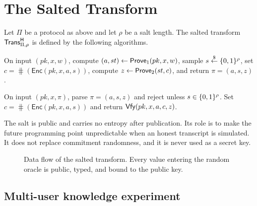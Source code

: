 \section{The Salted Transform}
\label{sec:transform}

Let $\Pi$ be a protocol as above and let $\rho$ be a salt length.  The salted
transform $\mathsf{Trans}^{\mathsf{H}}_{\Pi,\rho}$ is defined by the following algorithms.

 On input $(pk,x,w)$, compute
    $(a,st)\leftarrow\mathsf{Prove}_1(pk,x,w)$, sample $s\mathrel{\mathop{\leftarrow}\limits^{\$}}\{0,1\}^\rho$, set
    $c=\hash(\mathsf{Enc}(pk,x,a,s))$, compute
    $z\leftarrow\mathsf{Prove}_2(st,c)$, and return $\pi=(a,s,z)$.

 On input $(pk,x,\pi)$, parse
$\pi=(a,s,z)$ and reject unless $s\in\{0,1\}^\rho$.  Set
$c=\hash(\mathsf{Enc}(pk,x,a,s))$ and return
$\mathsf{Vfy}(pk,x,a,c,z)$.

The salt is public and carries no entropy after publication.  Its role is to
make the future programming point unpredictable when an honest transcript is
simulated.  It does not replace commitment randomness, and it is never used as
a secret key.

\begin{figure}[t]
  \centering
  \caption{Data flow of the salted transform.  Every value entering the random
  oracle is public, typed, and bound to the public key.}
  \label{fig:transform}
\end{figure}

\subsection{Multi-user knowledge experiment}


